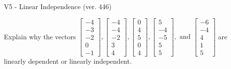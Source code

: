 \begin{exercise}
  \begin{exerciseTitle}V5 - Linear Independence (ver. 446)\end{exerciseTitle}
  \begin{exerciseStatement}
    Explain why the vectors \(\left[\begin{array}{r}
-4 \\
-3 \\
-2 \\
0 \\
-1
\end{array}\right] , \left[\begin{array}{r}
-4 \\
-4 \\
-2 \\
3 \\
4
\end{array}\right] , \left[\begin{array}{r}
0 \\
4 \\
5 \\
0 \\
4
\end{array}\right] , \left[\begin{array}{r}
5 \\
-4 \\
-5 \\
5 \\
5
\end{array}\right] , \text{ and } \left[\begin{array}{r}
-6 \\
-4 \\
4 \\
1 \\
5
\end{array}\right]\) are linearly dependent or linearly independent.	



\end{exerciseStatement}
\end{exercise}
